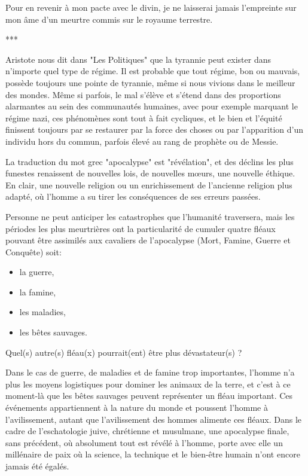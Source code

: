 Pour en revenir à mon pacte avec le divin, je ne laisserai jamais l’empreinte sur mon âme d’un meurtre commis sur le royaume terrestre.

\begin{center}
***
\end{center}

Aristote nous dit dans "Les Politiques" que la tyrannie peut exister dans n’importe quel type de régime. Il est probable que tout régime, bon ou mauvais, possède toujours une pointe de tyrannie, même si nous vivions dans le meilleur des mondes. Même si parfois, le mal s’élève et s’étend dans des proportions alarmantes au sein des communautés humaines, avec pour exemple marquant le régime nazi, ces phénomènes sont tout à fait cycliques, et le bien et l’équité finissent toujours par se restaurer par la force des choses ou par l’apparition d’un individu hors du commun, parfois élevé au rang de prophète ou de Messie.

La traduction du mot grec "apocalypse" est "révélation", et des déclins les plus funestes renaissent de nouvelles lois, de nouvelles mœurs, une nouvelle éthique. En clair, une nouvelle religion ou un enrichissement de l’ancienne religion plus adapté, où l’homme a su tirer les conséquences de ses erreurs passées.

Personne ne peut anticiper les catastrophes que l’humanité traversera, mais les périodes les plus meurtrières ont la particularité de cumuler quatre fléaux pouvant être assimilés aux cavaliers de l'apocalypse (Mort, Famine, Guerre et Conquête) soit:

\begin{itemize}
\item la guerre,
\item la famine,
\item les maladies,
\item les bêtes sauvages.
\end{itemize}

Quel(s) autre(s) fléau(x) pourrait(ent) être plus dévastateur(s) ?

Dans le cas de guerre, de maladies et de famine trop importantes, l’homme n’a plus les moyens logistiques pour dominer les animaux de la terre, et c’est à ce moment-là que les bêtes sauvages peuvent représenter un fléau important. Ces événements appartiennent à la nature du monde et poussent l’homme à l’avilissement, autant que l’avilissement des hommes alimente ces fléaux. Dans le cadre de l’eschatologie juive, chrétienne et musulmane, une apocalypse finale, sans précédent, où absolument tout est révélé à l’homme, porte avec elle un millénaire de paix où la science, la technique et le bien-être humain n'ont encore jamais été égalés.

